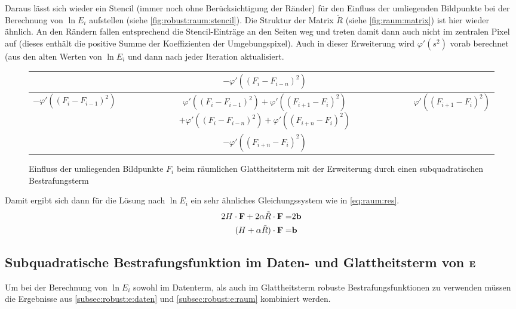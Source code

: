 Daraus lässt sich wieder ein Stencil (immer noch ohne Berücksichtigung der Ränder) für den Einfluss der umliegenden Bildpunkte bei der Berechnung von $\ln E_i$ aufstellen (siehe \autoref{fig:robust:raum:stencil}). Die Struktur der Matrix $\tilde R$ (siehe \autoref{fig:raum:matrix}) ist hier wieder ähnlich. An den Rändern fallen entsprechend die Stencil-Einträge an den Seiten weg und treten damit dann auch nicht im zentralen Pixel auf (dieses enthält die positive Summe der Koeffizienten der Umgebungspixel). Auch in dieser Erweiterung wird $\varphi'(s^2)$ vorab berechnet (aus den alten Werten von $\ln E_i$ und dann nach jeder Iteration aktualisiert.

\begin{figure}
  \begin{center}
    \begin{tabular}{c|c|c}
        \cline{2-2}
        & $-\varphi'((F_i - F_{i-n})^2)$ & \\
        \hline
            \multicolumn{1}{|c|}{$-\varphi'((F_i - F_{i-1})^2)$}
            & \shortstack{$\varphi'((F_i - F_{i-1})^2) + \varphi'((F_{i+1} - F_{i})^2) $ \\
              $ +\varphi'((F_i - F_{i-n})^2) + \varphi'((F_{i+n} - F_{i})^2)$} & 
            \multicolumn{1}{c|}{$\varphi'((F_{i+1} - F_{i})^2)$}\\
        \hline
        & $-\varphi'((F_{i+n} - F_{i})^2)$ & \\
        \cline{2-2} 
    \end{tabular}
  \end{center}
\caption{Einfluss der umliegenden Bildpunkte $F_i$ beim räumlichen Glattheitsterm mit der Erweiterung durch einen subquadratischen Bestrafungsterm}
\label{fig:robust:raum:stencil}
\end{figure}

Damit ergibt sich dann für die Lösung nach $\ln E_i$ ein sehr ähnliches Gleichungssystem wie in \autoref{eq:raum:res}. 
\begin{align}
\label{eq:robust:raum:lgs}
2 H \cdot \mathbf F + 2 \alpha \tilde R\cdot \mathbf F =& 2 \mathbf b \\
(H+\alpha \tilde R)\cdot \mathbf F =& \mathbf b
\end{align}






\subsection{Subquadratische Bestrafungsfunktion im Daten- und Glattheitsterm von $\mathbf E$ }
Um bei der Berechnung von $\ln E_i$ sowohl im Datenterm, als auch im Glattheitsterm robuste Bestrafungsfunktionen zu verwenden müssen die Ergebnisse aus \autoref{subsec:robust:e:daten} und \autoref{subsec:robust:e:raum} kombiniert werden.


